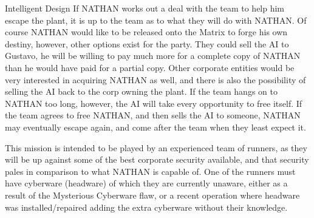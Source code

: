 \begin{scenario}{Intelligent Design}
If NATHAN works out a deal with the team to help him escape the plant, it is up to the team as to what they will do with NATHAN. Of course NATHAN would like to be released onto the Matrix to forge his own destiny, however, other options exist for the party. They could sell the AI to Gustavo, he will be willing to pay much more for a complete copy of NATHAN than he would have paid for a partial copy. Other corporate entities would be very interested in acquiring NATHAN as well, and there is also the possibility of selling the AI back to the corp owning the plant. If the team hangs on to NATHAN too long, however, the AI will take every opportunity to free itself. If the team agrees to free NATHAN, and then sells the AI to someone, NATHAN may eventually escape again, and come after the team when they least expect it.

\notes This mission is intended to be played by an experienced team of runners, as they will be up against some of the best corporate security available, and that security pales in comparison to what NATHAN is capable of. One of the runners must have cyberware (headware) of which they are currently unaware, either as a result of the Mysterious Cyberware flaw, or a recent operation where headware was installed/repaired adding the extra cyberware without their knowledge.

\end{scenario}